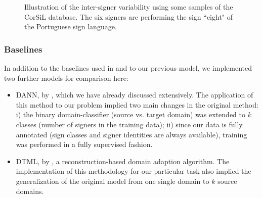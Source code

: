 \begin{figure}[t]
\begin{minipage}[t]{0.3\columnwidth}
    \end{minipage}
    \hspace{0.00mm}
    \begin{minipage}[t]{0.3\columnwidth}
    \end{minipage}
    \hspace{0.00mm}
    \begin{minipage}[t]{0.3\columnwidth}
    \end{minipage}
    \caption{Illustration of the inter-signer variability using some samples of the CorSiL database. The six signers are performing the sign ``eight" of the Portuguese sign language.}
    \label{fig:corsil}
\end{figure}

\subsubsection{Baselines}
In addition to the baselines used in  and to our previous model, we implemented two further models for comparison here:
\begin{itemize}
    \item DANN, by \citet{Ganin2015}, which we have already discussed extensively. The application of this method to our problem implied two main changes in the original method: i) the binary domain-classifier (source vs. target domain) was extended to $k$ classes (number of signers in the training data); ii) since our data is fully annotated (sign classes and signer identities are always available), training was performed in a fully supervised fashion.
    \item DTML, by \citet{Hu2016}, a reconstruction-based domain adaption algorithm. The implementation of this methodology for our particular task also implied the generalization of the original model from one single domain to $k$ source domains.
\end{itemize}

